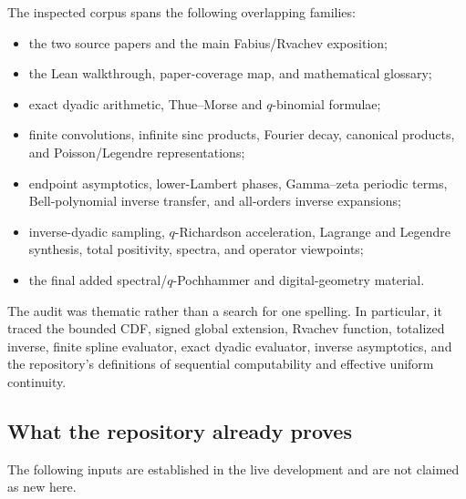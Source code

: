 \documentclass[11pt,oneside]{article}
\theoremstyle{definition}
\theoremstyle{remark}
\numberwithin{equation}{section}
\begin{document}
The inspected corpus spans the following overlapping families:
\begin{itemize}
\item the two source papers and the main Fabius/Rvachev exposition;
\item the Lean walkthrough, paper-coverage map, and mathematical glossary;
\item exact dyadic arithmetic, Thue--Morse and $q$-binomial formulae;
\item finite convolutions, infinite sinc products, Fourier decay, canonical
      products, and Poisson/Legendre representations;
\item endpoint asymptotics, lower-Lambert phases, Gamma--zeta periodic terms,
      Bell-polynomial inverse transfer, and all-orders inverse expansions;
\item inverse-dyadic sampling, $q$-Richardson acceleration, Lagrange and
      Legendre synthesis, total positivity, spectra, and operator viewpoints;
\item the final added spectral/$q$-Pochhammer and digital-geometry material.
\end{itemize}

The audit was thematic rather than a search for one spelling.  In particular,
it traced the bounded CDF, signed global extension, Rvachev function, totalized
inverse, finite spline evaluator, exact dyadic evaluator, inverse asymptotics,
and the repository's definitions of sequential computability and effective
uniform continuity.

\subsection{What the repository already proves}

The following inputs are established in the live development and are not
claimed as new here.
\end{document}
